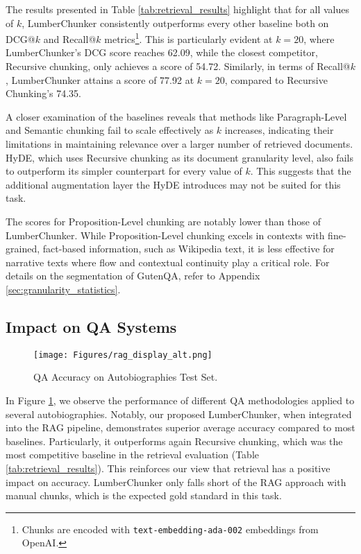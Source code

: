 The results presented in Table \ref{tab:retrieval_results} highlight that for all values of \(k\), LumberChunker consistently outperforms every other baseline both on DCG@$k$ and Recall@$k$ metrics\footnote{Chunks are encoded with \texttt{text-embedding-ada-002} embeddings from OpenAI.}. This is particularly evident at \(k = 20\), where LumberChunker's DCG score reaches 62.09, while the closest competitor, Recursive chunking, only achieves a score of 54.72. Similarly, in terms of Recall@$k$, LumberChunker attains a score of 77.92 at \(k = 20\), compared to Recursive Chunking's 74.35.
\par
A closer examination of the baselines reveals that methods like Paragraph-Level and Semantic chunking fail to scale effectively as $k$ increases, indicating their limitations in maintaining relevance over a larger number of retrieved documents. HyDE, which uses Recursive chunking as its document granularity level, also fails to outperform its simpler counterpart for every value of $k$. This suggests that the additional augmentation layer the HyDE introduces may not be suited for this task.
\par
The scores for Proposition-Level chunking are notably lower than those of LumberChunker. While Proposition-Level chunking excels in contexts with fine-grained, fact-based information, such as Wikipedia text, it is less effective for narrative texts where flow and contextual continuity play a critical role. For details on the segmentation of GutenQA, refer to Appendix \ref{sec:granularity_statistics}.



\subsection{Impact on QA Systems}

\begin{figure}[h]
    \centering
    \texttt{[image: Figures/rag\_display\_alt.png]}
    \caption{QA Accuracy on Autobiographies Test Set.}
    \label{fig:rag_accuracy}
\end{figure}

In Figure \ref{fig:rag_accuracy}, we observe the performance of different QA methodologies applied to several autobiographies. Notably, our proposed LumberChunker, when integrated into the RAG pipeline, demonstrates superior average accuracy compared to most baselines. Particularly, it outperforms again Recursive chunking, which was the most competitive baseline in the retrieval evaluation (Table \ref{tab:retrieval_results}). This reinforces our view that retrieval has a positive impact on accuracy. LumberChunker only falls short of the RAG approach with manual chunks, which is the expected gold standard in this task.



